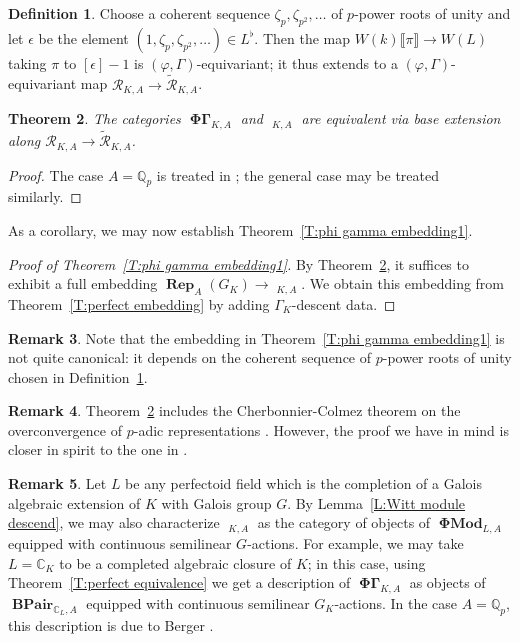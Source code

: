 \documentclass[12pt]{amsart}
\newtheorem{theorem}{Theorem}[section]
\theoremstyle{definition}
\newtheorem{defn}[theorem]{Definition}
\newtheorem{remark}[theorem]{Remark}
\numberwithin{equation}{theorem}
\newcommand{\CC}{\mathbb{C}}
\newcommand{\QQ}{\mathbb{Q}}
\newcommand{\calR}{\mathcal{R}}
\DeclareMathOperator{\BPair}{\mathbf{BPair}}
\DeclareMathOperator{\PhiGamma}{\mathbf{\Phi \Gamma}}
\DeclareMathOperator{\PhiGammatilde}{\widetilde{\mathbf{\Phi \Gamma}}}
\DeclareMathOperator{\PhiMod}{\mathbf{\Phi Mod}}
\DeclareMathOperator{\Rep}{\mathbf{Rep}}
\begin{document}
\begin{defn} \label{D:untilde to tilde map}
Choose a coherent sequence $\zeta_p, \zeta_{p^2}, \dots$ of $p$-power roots of unity
and let $\epsilon$ be the element $(1, \zeta_p, \zeta_{p^2}, \dots) \in L^{\flat}$.
Then the map $W(k) \llbracket \pi \rrbracket \to W(L)$ taking $\pi$ to $[\epsilon]-1$
is $(\varphi, \Gamma)$-equivariant; it thus extends to a $(\varphi, \Gamma)$-equivariant map $\calR_{K,A} \to \tilde{\calR}_{K,A}$.
\end{defn}


\begin{theorem} \label{T:tilde no tilde}
The categories $\PhiGamma_{K,A}$ and $\PhiGammatilde_{K,A}$ are equivalent via base extension along $\calR_{K,A} \to \tilde{\calR}_{K,A}$.
\end{theorem}
\begin{proof}
The case $A = \QQ_p$ is treated in \cite{kedlaya-liu2}; the general case may be treated similarly.
\end{proof}

As a corollary, we may now establish Theorem~\ref{T:phi gamma embedding1}.
\begin{proof}[Proof of Theorem~\ref{T:phi gamma embedding1}]
By Theorem~\ref{T:tilde no tilde}, it suffices to exhibit a full embedding
$\Rep_A(G_K) \to \PhiGammatilde_{K,A}$. We obtain this embedding from
Theorem~\ref{T:perfect embedding} by adding $\Gamma_K$-descent data.
\end{proof}

\begin{remark}
Note that the embedding in Theorem~\ref{T:phi gamma embedding1} is not quite canonical: it depends on the coherent sequence of $p$-power roots of unity chosen in Definition~\ref{D:untilde to tilde map}.
\end{remark}

\begin{remark}
Theorem~\ref{T:tilde no tilde} includes the Cherbonnier-Colmez theorem on the overconvergence of $p$-adic representations \cite{cherbonnier-colmez}. However, the proof we have in mind is closer in spirit to the one in \cite[\S 2]{kedlaya-new-phigamma}.
\end{remark}

\begin{remark} \label{R:general field}
Let $L$ be any perfectoid field which is the completion of a Galois algebraic extension of $K$ with Galois group $G$.
By Lemma~\ref{L:Witt module descend}, we may also characterize $\PhiGammatilde_{K,A}$ 
as the category of objects of $\PhiMod_{L,A}$ equipped with continuous semilinear $G$-actions. For example, we may take $L = \CC_K$ to be a completed algebraic closure of $K$;
in this case, using Theorem~\ref{T:perfect equivalence} we get a description of
$\PhiGamma_{K,A}$ as objects of $\BPair_{\CC_L,A}$ equipped with continuous semilinear $G_K$-actions. In the case $A = \QQ_p$, this description is due to Berger \cite{berger-b-pairs}.
\end{remark}
\end{document}

